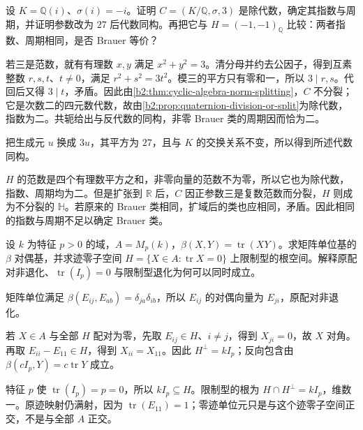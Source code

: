 \begin{exercise}\label{b2:ex:18-rational-norm-brauer-classes}
	设 \(K=\mathbb Q(i)\)、\(\sigma(i)=-i\)。证明 \(C=(K/\mathbb Q,\sigma,3)\) 是除代数，确定其指数与周期，并证明参数改为 \(27\) 后代数同构。再把它与 \(H=(-1,-1)_{\mathbb Q}\) 比较：两者指数、周期相同，是否 Brauer 等价？
\end{exercise}
\begin{solution}
	若三是范数，就有有理数 \(x,y\) 满足 \(x^2+y^2=3\)。清分母并约去公因子，得到互素整数 \(r,s,t\)、\(t\ne0\)，满足 \(r^2+s^2=3t^2\)。模三的平方只有零和一，所以 \(3\mid r,s\)。代回后又得 \(3\mid t\)，矛盾。因此由\cref{b2:thm:cyclic-algebra-norm-splitting}，\(C\) 不分裂；它是次数二的四元数代数，故由\cref{b2:prop:quaternion-division-or-split}为除代数，指数为二。共轭给出与反代数的同构，非零 Brauer 类的周期因而恰为二。

	把生成元 \(u\) 换成 \(3u\)，其平方为 \(27\)，且与 \(K\) 的交换关系不变，所以得到所述代数同构。

	\(H\) 的范数是四个有理数平方之和，非零向量的范数不为零，所以它也为除代数，指数、周期均为二。但是扩张到 \(\mathbb R\) 后，\(C\) 因正参数三是复数范数而分裂，\(H\) 则成为不分裂的 \(\mathbb H\)。若原来的 Brauer 类相同，扩域后的类也应相同，矛盾。因此相同的指数与周期不足以确定 Brauer 类。
\end{solution}

\begin{exercise}\label{b2:ex:18-reduced-trace-pairing}
	设 \(k\) 为特征 \(p>0\) 的域，\(A=M_p(k)\)，\(\beta(X,Y)=\operatorname{tr}(XY)\)。求矩阵单位基的 \(\beta\) 对偶基，并求迹零子空间 \(H=\{X\in A:\operatorname{tr}X=0\}\) 上限制型的根空间。解释原配对非退化、\(\operatorname{tr}(I_p)=0\) 与限制型退化为何可以同时成立。
\end{exercise}
\begin{solution}
	矩阵单位满足 \(\beta(E_{ij},E_{ab})=\delta_{ja}\delta_{ib}\)，所以 \(E_{ij}\) 的对偶向量为 \(E_{ji}\)，原配对非退化。

	若 \(X\in A\) 与全部 \(H\) 配对为零，先取 \(E_{ij}\in H\)、\(i\ne j\)，得到 \(X_{ji}=0\)，故 \(X\) 对角。再取 \(E_{ii}-E_{11}\in H\)，得到 \(X_{ii}=X_{11}\)。因此 \(H^\perp=kI_p\)；反向包含由 \(\beta(cI_p,Y)=c\operatorname{tr}Y\) 成立。

	特征 \(p\) 使 \(\operatorname{tr}(I_p)=p=0\)，所以 \(kI_p\subseteq H\)。限制型的根为 \(H\cap H^\perp=kI_p\)，维数一。原迹映射仍满射，因为 \(\operatorname{tr}(E_{11})=1\)；零迹单位元只是与这个迹零子空间正交，不是与全部 \(A\) 正交。
\end{solution}

